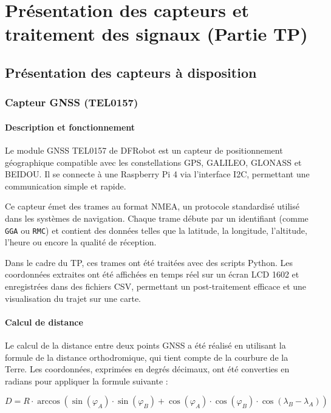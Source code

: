 \chapter{Présentation des capteurs et traitement des signaux (Partie TP)}

\section{Présentation des capteurs à disposition}

\subsection{Capteur GNSS (TEL0157)}

\subsubsection*{Description et fonctionnement}

Le module GNSS TEL0157 de DFRobot est un capteur de positionnement géographique compatible avec les constellations GPS, GALILEO, GLONASS et BEIDOU. Il se connecte à une Raspberry Pi 4 via l’interface I2C, permettant une communication simple et rapide.

Ce capteur émet des trames au format NMEA, un protocole standardisé utilisé dans les systèmes de navigation. Chaque trame débute par un identifiant (comme \texttt{GGA} ou \texttt{RMC}) et contient des données telles que la latitude, la longitude, l’altitude, l’heure ou encore la qualité de réception.

Dans le cadre du TP, ces trames ont été traitées avec des scripts Python. Les coordonnées extraites ont été affichées en temps réel sur un écran LCD 1602 et enregistrées dans des fichiers CSV, permettant un post-traitement efficace et une visualisation du trajet sur une carte.

\vspace{1em}
\subsubsection*{Calcul de distance}

Le calcul de la distance entre deux points GNSS a été réalisé en utilisant la formule de la distance orthodromique, qui tient compte de la courbure de la Terre. Les coordonnées, exprimées en degrés décimaux, ont été converties en radians pour appliquer la formule suivante :

\[
D = R \cdot \arccos\left( \sin(\varphi_A) \cdot \sin(\varphi_B) + \cos(\varphi_A) \cdot \cos(\varphi_B) \cdot \cos(\lambda_B - \lambda_A) \right)
\]

